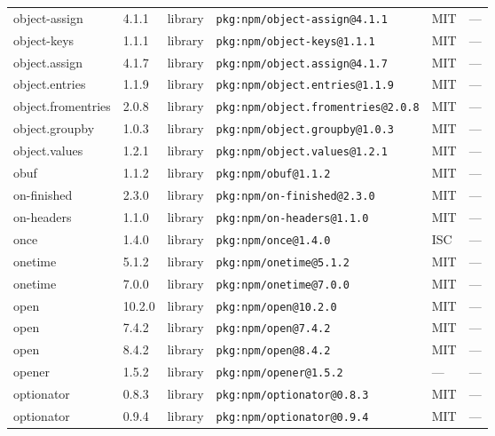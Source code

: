 \documentclass[11pt,a4paper]{article}
\begin{document}
\begin{longtable}{|p{4cm}|p{2cm}|p{1.6cm}|p{5cm}|p{1.5cm}|p{3.5cm}|}
\raggedright object-assign & 4.1.1 & library & \small\texttt{pkg:npm/object-assign@4.1.1} & MIT & \small — \\
\raggedright object-keys & 1.1.1 & library & \small\texttt{pkg:npm/object-keys@1.1.1} & MIT & \small — \\
\raggedright object.assign & 4.1.7 & library & \small\texttt{pkg:npm/object.assign@4.1.7} & MIT & \small — \\
\raggedright object.entries & 1.1.9 & library & \small\texttt{pkg:npm/object.entries@1.1.9} & MIT & \small — \\
\raggedright object.fromentries & 2.0.8 & library & \small\texttt{pkg:npm/object.fromentries@2.0.8} & MIT & \small — \\
\raggedright object.groupby & 1.0.3 & library & \small\texttt{pkg:npm/object.groupby@1.0.3} & MIT & \small — \\
\raggedright object.values & 1.2.1 & library & \small\texttt{pkg:npm/object.values@1.2.1} & MIT & \small — \\
\raggedright obuf & 1.1.2 & library & \small\texttt{pkg:npm/obuf@1.1.2} & MIT & \small — \\
\raggedright on-finished & 2.3.0 & library & \small\texttt{pkg:npm/on-finished@2.3.0} & MIT & \small — \\
\raggedright on-headers & 1.1.0 & library & \small\texttt{pkg:npm/on-headers@1.1.0} & MIT & \small — \\
\raggedright once & 1.4.0 & library & \small\texttt{pkg:npm/once@1.4.0} & ISC & \small — \\
\raggedright onetime & 5.1.2 & library & \small\texttt{pkg:npm/onetime@5.1.2} & MIT & \small — \\
\raggedright onetime & 7.0.0 & library & \small\texttt{pkg:npm/onetime@7.0.0} & MIT & \small — \\
\raggedright open & 10.2.0 & library & \small\texttt{pkg:npm/open@10.2.0} & MIT & \small — \\
\raggedright open & 7.4.2 & library & \small\texttt{pkg:npm/open@7.4.2} & MIT & \small — \\
\raggedright open & 8.4.2 & library & \small\texttt{pkg:npm/open@8.4.2} & MIT & \small — \\
\raggedright opener & 1.5.2 & library & \small\texttt{pkg:npm/opener@1.5.2} & — & \small — \\
\raggedright optionator & 0.8.3 & library & \small\texttt{pkg:npm/optionator@0.8.3} & MIT & \small — \\
\raggedright optionator & 0.9.4 & library & \small\texttt{pkg:npm/optionator@0.9.4} & MIT & \small — \\

\end{longtable}
\end{document}
